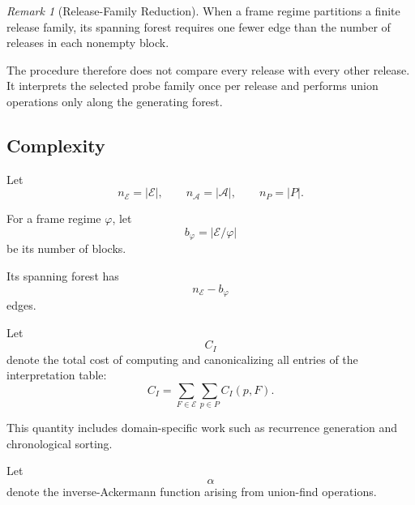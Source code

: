 \documentclass[11pt]{article}
\theoremstyle{plain}
\theoremstyle{definition}
\theoremstyle{remark}
\newtheorem{remark}[theorem]{Remark}
\begin{document}
\begin{remark}[Release-Family Reduction]
  \label{ik.rem.release-family-reduction}
  When a frame regime partitions
  a finite release family,
  its spanning forest requires
  one fewer edge than the number of releases
  in each nonempty block.

  The procedure therefore does not compare
  every release with every other release.
  It interprets the selected probe family once per release
  and performs union operations only along
  the generating forest.
\end{remark}

\subsection{Complexity}

Let
\[
  n_{\mathcal{E}}
  =
  |\mathcal{E}|,
  \qquad
  n_{\mathcal{A}}
  =
  |\mathcal{A}|,
  \qquad
  n_P
  =
  |P|.
\]

For a frame regime \(\varphi\),
let
\[
  b_{\varphi}
  =
  |\mathcal{E}/\varphi|
\]
be its number of blocks.

Its spanning forest has
\[
  n_{\mathcal{E}}
  -
  b_{\varphi}
\]
edges.

Let
\[
  C_I
\]
denote the total cost
of computing and canonicalizing
all entries of the interpretation table:
\[
  C_I
  =
  \sum_{F\in\mathcal{E}}
  \sum_{p\in P}
  C_I(p,F).
\]

This quantity includes domain-specific work
such as recurrence generation
and chronological sorting.

Let
\[
  \alpha
\]
denote the inverse-Ackermann function
arising from union-find operations.
\end{document}
